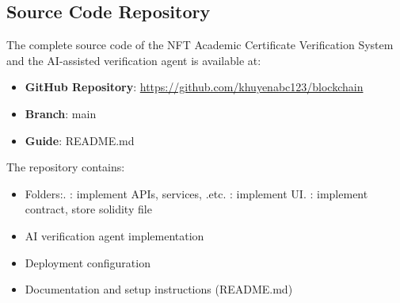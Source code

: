 \subsection{Source Code Repository}


The complete source code of the NFT Academic Certificate Verification System and the AI-assisted verification agent is available at:

\begin{itemize}
    \item \textbf{GitHub Repository}: \url{https://github.com/khuyenabc123/blockchain}
    \item \textbf{Branch}: main
    \item \textbf{Guide}: README.md
\end{itemize}

The repository contains:

\begin{itemize}
    \item Folders:. : implement APIs, services, .etc. : implement UI. : implement contract, store solidity file
    \item AI verification agent implementation
    \item Deployment configuration
    \item Documentation and setup instructions (README.md)
\end{itemize}
